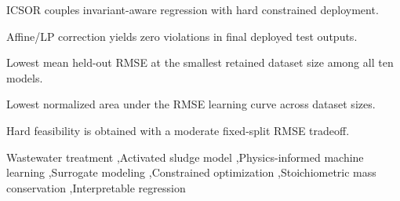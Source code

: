 \documentclass[a4paper,fleqn]{cas-sc}
\DeclareRobustCommand{\currentrev}[1]{{\color{currentRevisionBlue}#1}}
\DeclareRobustCommand{\currentrev}[1]{#1}
\newcommand{\rev}[1]{#1}
\begin{document}
\begin{highlights}
\item \rev{\currentrev{ICSOR couples invariant-aware regression with hard constrained deployment.}}
\item \rev{\currentrev{Affine/LP correction yields zero violations in final deployed test outputs.}}
\item \rev{Lowest mean held-out RMSE at the smallest retained dataset size among all ten models.}
\item \rev{Lowest normalized area under the RMSE learning curve across dataset sizes.}
\item \rev{\currentrev{Hard feasibility is obtained with a moderate fixed-split RMSE tradeoff.}}
\end{highlights}

\begin{keywords}
\rev{Wastewater treatment \sep Activated sludge model \sep Physics-informed machine learning \sep Surrogate modeling \sep Constrained optimization \sep Stoichiometric mass conservation \sep Interpretable regression}
\end{keywords}

\maketitle
\end{document}
